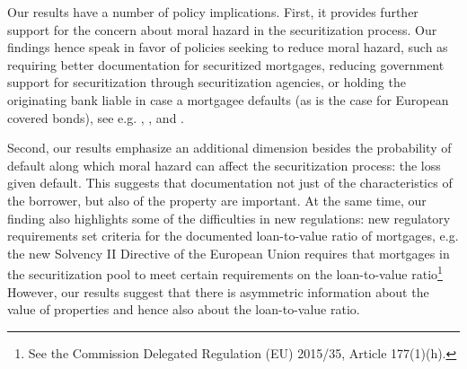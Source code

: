 \documentclass[11pt,twopage]{article}
\begin{document}
Our results have a number of policy implications. First, it provides further support for the concern about moral hazard in the securitization process. Our findings hence speak in favor of policies seeking to reduce moral hazard, such as requiring better documentation for securitized mortgages, reducing government support for securitization through securitization agencies, or holding the originating bank liable in case a mortgagee defaults (as is the case for European covered bonds), see e.g. \cite{keys2008did}, \cite{tirole2011illiquidity}, and \cite{campbell2013mortgage}.

Second, our results emphasize an additional dimension besides the probability of default along which moral hazard can affect the securitization process: the loss given default. This suggests that documentation not just of the characteristics of the borrower, but also of the property are important. At the same time, our finding also highlights some of the difficulties in new regulations: new regulatory requirements set criteria for the documented loan-to-value ratio of mortgages, e.g. the new Solvency II Directive of the European Union requires that mortgages in the securitization pool to meet certain requirements on the loan-to-value ratio\footnote{See the Commission Delegated Regulation (EU) 2015/35, Article 177(1)(h).} However, our results suggest that there is asymmetric information about the value of properties and hence also about the loan-to-value ratio.
\end{document}
